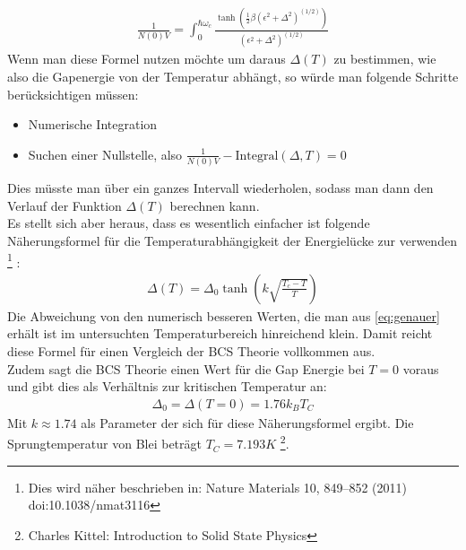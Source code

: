 \documentclass[twoside,        %
               BCOR12mm,       %
               english,ngerman, %
               fleqn,headsepline=false,footsepline=false
              ]{MFPREPORT}
\begin{document}
\begin{align}
\frac{1}{N(0) V} = \int_{0}^{\hbar \omega_c} \frac{\tanh \left( \frac{1}{2} \beta (\epsilon^2 + \Delta^2)^(1/2) \right) }{(\epsilon^2 + \Delta^2)^(1/2)}
\label{eq:genauer}
\end{align}
Wenn man diese Formel nutzen möchte um daraus $\Delta(T)$ zu bestimmen, wie also die Gapenergie von der Temperatur abhängt, so würde man folgende Schritte berücksichtigen müssen:
\begin{itemize}
\item Numerische Integration 
\item Suchen einer Nullstelle, also $\frac{1}{N(0) V} - \text{Integral}(\Delta, T) = 0$
\end{itemize}
Dies müsste man über ein ganzes Intervall wiederholen, sodass man dann den Verlauf der Funktion $\Delta(T)$ berechnen kann.
\\
Es stellt sich aber heraus, dass es wesentlich einfacher ist folgende Näherungsformel für die Temperaturabhängigkeit der Energielücke zur verwenden
\footnote{Dies wird näher beschrieben in:
    Nature Materials
    10,
    849–852
    (2011)
    doi:10.1038/nmat3116}
:
\begin{align}
\Delta(T) = \Delta_{0} \tanh \left( k \sqrt{\frac{T_{c}-T}{T}} \right)
\label{eq:korrun}
\end{align}
Die Abweichung von den numerisch besseren Werten, die man aus \ref{eq:genauer} erhält ist im untersuchten Temperaturbereich hinreichend klein. 
Damit reicht diese Formel für einen Vergleich der BCS Theorie vollkommen aus.
\\
Zudem sagt die BCS Theorie einen Wert für die Gap Energie bei $T=0$ voraus und gibt dies als Verhältnis zur kritischen Temperatur an:
\begin{align}
\Delta_{0}
=
\Delta(T=0)
= 1.76 k_{B} T_{C}
\end{align}
Mit $k \approx1.74$ als Parameter der sich für diese Näherungsformel ergibt.
Die Sprungtemperatur von Blei beträgt $T_{C} = 7.193 K$ 
\footnote{Charles Kittel: Introduction to Solid State Physics}.
\end{document}
